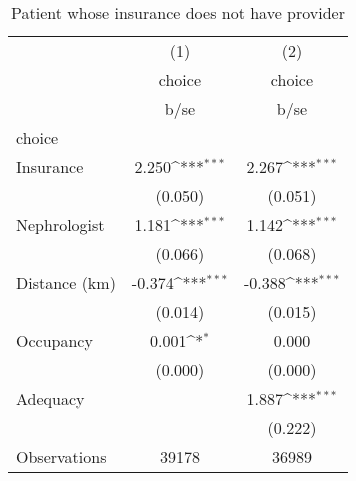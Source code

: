 \begin{table}[htbp]\centering
\def\sym#1{\ifmmode^{#1}\else\(^{#1}\)\fi}
\caption{Patient whose insurance does not have provider}
\begin{tabular}{l*{2}{c}}
\hline\hline
                    &\multicolumn{1}{c}{(1)}&\multicolumn{1}{c}{(2)}\\
                    &\multicolumn{1}{c}{choice}&\multicolumn{1}{c}{choice}\\
                    &        b/se         &        b/se         \\
\hline
choice              &                     &                     \\
Insurance           &       2.250\sym{***}&       2.267\sym{***}\\
                    &     (0.050)         &     (0.051)         \\
Nephrologist        &       1.181\sym{***}&       1.142\sym{***}\\
                    &     (0.066)         &     (0.068)         \\
Distance (km)       &      -0.374\sym{***}&      -0.388\sym{***}\\
                    &     (0.014)         &     (0.015)         \\
Occupancy           &       0.001\sym{*}  &       0.000         \\
                    &     (0.000)         &     (0.000)         \\
Adequacy            &                     &       1.887\sym{***}\\
                    &                     &     (0.222)         \\
\hline
Observations        &       39178         &       36989         \\
\hline\hline
\end{tabular}
\end{table}

